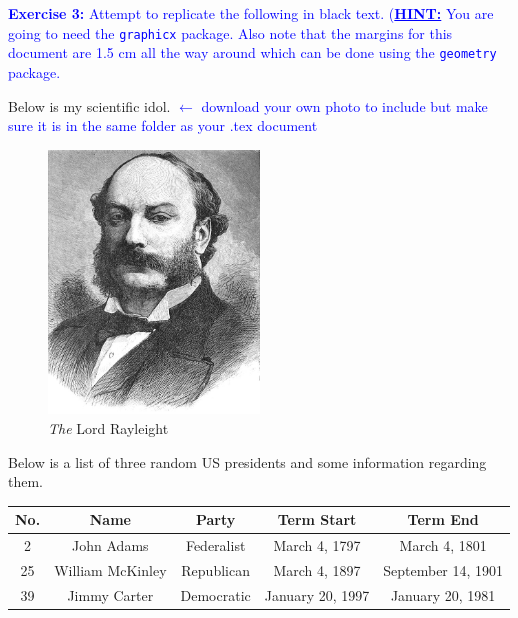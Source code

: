 \documentclass[]{article}
\newcommand{\BlueText}[1]{\textcolor{blue}{#1}}
\begin{document}
\noindent \BlueText{\textbf{Exercise 3:} Attempt to replicate the following in black text.
(\textbf{\underline{HINT:}} You are going to need the \texttt{graphicx} package. Also note that the margins for this document are 1.5 cm all the way around which can be done using the \texttt{geometry} package.}
\vspace{1cm}

\noindent Below is my scientific idol. \BlueText{$\leftarrow$ download your own photo to include but make sure it is in the same folder as your .tex document}

\begin{figure}[h]
\centering
	\includegraphics[width = 0.5\textwidth] {./Rayleigh.jpg}
	\caption{\textit{The} Lord Rayleight}
\end{figure}

\noindent Below is a list of three random US presidents and some information regarding them.

\begin{table}[h]
\centering
\begin{tabular}{| c | c | c | c | c |}
	\hline
	\textbf{No.} & \textbf{Name} & \textbf{Party} & \textbf{Term Start} & \textbf{Term End} \\ \hline
	2 & John Adams & Federalist & March 4, 1797 & March 4, 1801 \\ \hline
	25 & William McKinley & Republican & March 4, 1897 & September 14, 1901 \\ \hline
	39 & Jimmy Carter & Democratic & January 20, 1997 & January 20, 1981 \\ \hline
\end{tabular}
\end{table}
\end{document}
